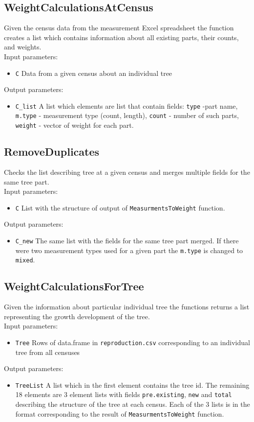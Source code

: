 \documentclass[10pt]{book} %
\begin{document}
\subsection*{WeightCalculationsAtCensus}
Given the census data from the measurement Excel spreadsheet the function creates a list which contains information about all existing parts, their counts, and weights.
\\
Input parameters:
\begin{itemize}
\item \texttt{C}  Data from a given census about an individual tree
\end{itemize}
Output parameters:
\begin{itemize}
\item \texttt{C\_list}   A list which elements are list that contain fields: \texttt{type} -part name, \texttt{m.type} - measurement type (count, length), \texttt{count} - number of such parts, \texttt{weight} - vector of weight for each part.
\end{itemize}

\subsection*{RemoveDuplicates}
Checks the list describing tree at a given census and merges multiple fields for the same tree part.
\\
Input parameters:
\begin{itemize}
\item \texttt{C}  List with the structure of output of \texttt{MeasurmentsToWeight} function.
\end{itemize}
Output parameters:
\begin{itemize}
\item \texttt{C\_new}  The same list with the fields for the same tree part merged. If there were two measurement types used for a given part the \texttt{m.type} is changed to \texttt{mixed}.
\end{itemize}


\subsection*{WeightCalculationsForTree}
Given the information about particular individual tree the functions returns a list representing the growth development of the tree.
\\
Input parameters:
\begin{itemize}
\item \texttt{Tree}  Rows of data.frame in  \texttt{reproduction.csv} corresponding to  an individual tree from all censuses
\end{itemize}
Output parameters:
\begin{itemize}
\item \texttt{TreeList}  A list which in the first element contains the tree id. The remaining 18 elements are 3 element lists with fields \texttt{pre.existing}, \texttt{new} and \texttt{total} describing the structure of the tree at each census. Each of the 3 lists is in the format corresponding to the result of \texttt{MeasurmentsToWeight} function.
\end{itemize}
\end{document}
